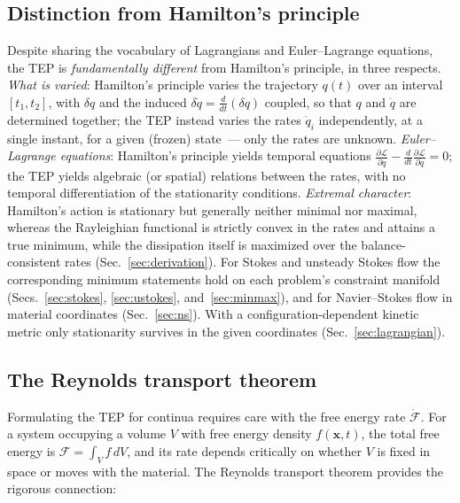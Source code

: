 \documentclass[aip,pof,reprint,amsmath,amssymb,longbibliography]{revtex4-2}
\begin{document}
\subsection{Distinction from Hamilton's principle}
\label{sec:distinction}

Despite sharing the vocabulary of Lagrangians and Euler--Lagrange equations, the TEP is \textit{fundamentally different} from Hamilton's principle, in three respects. \textit{What is varied}: Hamilton's principle varies the trajectory $q(t)$ over an interval $[t_1,t_2]$, with $\delta q$ and the induced $\delta \dot{q} = \frac{d}{dt}(\delta q)$ coupled, so that $q$ and $\dot q$ are determined together; the TEP instead varies the rates $\dot{q}_i$ independently, at a single instant, for a given (frozen) state~--- only the rates are unknown. \textit{Euler--Lagrange equations}: Hamilton's principle yields temporal equations $\frac{\partial \mathscr{L}}{\partial q} - \frac{d}{dt}\frac{\partial \mathscr{L}}{\partial \dot{q}} = 0$; the TEP yields algebraic (or spatial) relations between the rates, with no temporal differentiation of the stationarity conditions. \textit{Extremal character}: Hamilton's action is stationary but generally neither minimal nor maximal, whereas the Rayleighian functional is strictly convex in the rates and attains a true minimum, while the dissipation itself is maximized over the balance-consistent rates (Sec.~\ref{sec:derivation}). For Stokes and unsteady Stokes flow the corresponding minimum statements hold on each problem's constraint manifold (Secs.~\ref{sec:stokes}, \ref{sec:ustokes}, and~\ref{sec:minmax}), and for Navier--Stokes flow in material coordinates (Sec.~\ref{sec:ns}). With a configuration-dependent kinetic metric only stationarity survives in the given coordinates (Sec.~\ref{sec:lagrangian}).



\subsection{The Reynolds transport theorem}
\label{sec:rtt}

Formulating the TEP for continua requires care with the free energy rate $\dot{\mathcal{F}}$. For a system occupying a volume $V$ with free energy density $f(\boldsymbol{x},t)$, the total free energy is $\mathcal{F} = \int_V f\, dV$, and its rate depends critically on whether $V$ is fixed in space or moves with the material. The Reynolds transport theorem provides the rigorous connection:
\end{document}
